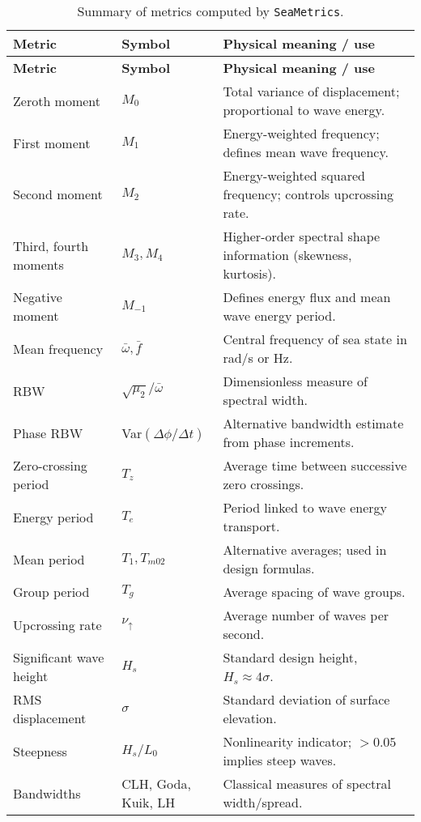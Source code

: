 \documentclass[11pt]{article}
\begin{document}
\renewcommand{\arraystretch}{1.2}
\begin{longtable}{|l|l|p{8cm}|}
\caption{Summary of metrics computed by \texttt{SeaMetrics}.} \label{tab:metrics} \\
\hline
\textbf{Metric} & \textbf{Symbol} & \textbf{Physical meaning / use} \\
\hline
\endfirsthead
\hline
\textbf{Metric} & \textbf{Symbol} & \textbf{Physical meaning / use} \\
\hline
\endhead
\hline
\endfoot
\hline
\endlastfoot
Zeroth moment & $M_0$ & Total variance of displacement; proportional to wave energy. \\
First moment & $M_1$ & Energy-weighted frequency; defines mean wave frequency. \\
Second moment & $M_2$ & Energy-weighted squared frequency; controls upcrossing rate. \\
Third, fourth moments & $M_3, M_4$ & Higher-order spectral shape information (skewness, kurtosis). \\
Negative moment & $M_{-1}$ & Defines energy flux and mean wave energy period. \\
\hline
Mean frequency & $\bar{\omega}, \bar{f}$ & Central frequency of sea state in rad/s or Hz. \\
RBW & $\sqrt{\mu_2}/\bar{\omega}$ & Dimensionless measure of spectral width. \\
Phase RBW & Var$(\Delta \phi / \Delta t)$ & Alternative bandwidth estimate from phase increments. \\
\hline
Zero-crossing period & $T_z$ & Average time between successive zero crossings. \\
Energy period & $T_e$ & Period linked to wave energy transport. \\
Mean period & $T_1, T_{m02}$ & Alternative averages; used in design formulas. \\
Group period & $T_g$ & Average spacing of wave groups. \\
Upcrossing rate & $\nu_\uparrow$ & Average number of waves per second. \\
\hline
Significant wave height & $H_s$ & Standard design height, $H_s \approx 4\sigma$. \\
RMS displacement & $\sigma$ & Standard deviation of surface elevation. \\
Steepness & $H_s/L_0$ & Nonlinearity indicator; $>0.05$ implies steep waves. \\
\hline
Bandwidths & CLH, Goda, Kuik, LH & Classical measures of spectral width/spread. \\

\end{longtable}
\end{document}
